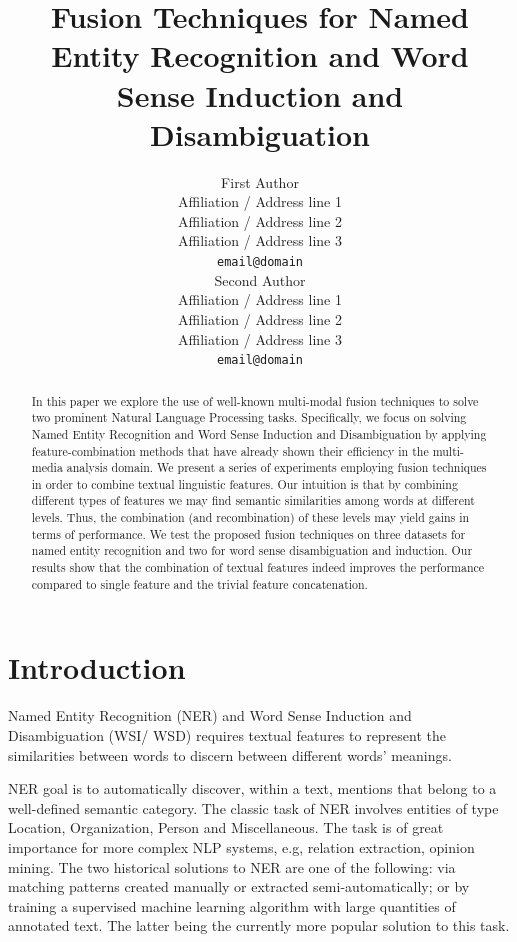 \documentclass{llncs}
\title{Fusion Techniques for Named Entity Recognition and Word Sense Induction and Disambiguation}
\author{First Author\\
  Affiliation / Address line 1 \\
  Affiliation / Address line 2 \\
  Affiliation / Address line 3 \\
  {\tt email@domain} \\\And
  Second Author \\
  Affiliation / Address line 1 \\
  Affiliation / Address line 2 \\
  Affiliation / Address line 3 \\
  {\tt email@domain} \\}
\date{}
\begin{document}
\begin{abstract}
In this paper we explore the use of well-known multi-modal fusion techniques to solve two prominent Natural Language Processing tasks. Specifically, we focus on solving Named Entity Recognition and Word Sense Induction and Disambiguation by applying feature-combination methods that have already shown their efficiency in the multi-media analysis domain. We present a series of experiments employing fusion techniques in order to combine textual linguistic features. Our intuition is that by combining different types of features we may find semantic similarities among words at different levels. Thus, the combination (and recombination) of these levels may yield gains in terms of performance.
We test the proposed fusion techniques on three datasets for named entity recognition and two for word sense disambiguation and induction. Our results show that the combination of textual features indeed improves the performance compared to single feature and the trivial feature concatenation.
\end{abstract}


\section{Introduction}

Named Entity Recognition (NER) and Word Sense Induction and Disambiguation (WSI/ \allowbreak WSD) requires textual features to represent the similarities between words to discern between different words' meanings. 

NER goal is to automatically discover, within a text, mentions that belong to a well-defined semantic category. The classic task of NER involves entities of type Location, Organization, Person and Miscellaneous. The task is of great importance for more complex NLP systems, e.g, relation extraction, opinion mining. The two historical solutions to NER are one of the following: via matching patterns created manually or extracted semi-automatically; or by training a supervised machine learning algorithm with large quantities of annotated text. The latter being the currently more popular solution to this task.
\end{document}
